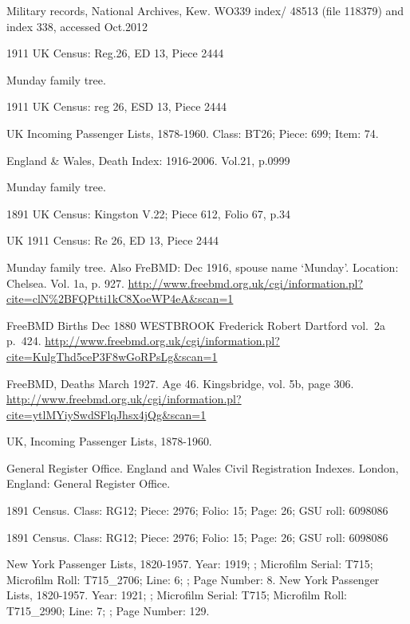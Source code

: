 \begin{thebibliography}{99}
	Military records, National Archives, Kew.
	WO339 index/ 48513 (file 118379) and index 338, accessed Oct.2012
	
	1911 UK Census: Reg.26, ED 13, Piece 2444 
	
	Munday family tree. 
	
	1911 UK Census: reg 26, ESD 13, Piece 2444 
	
	 UK Incoming Passenger Lists, 1878-1960. Class: BT26; Piece: 699; Item: 74.
	 
	England \& Wales, Death Index: 1916-2006. Vol.21, p.0999
	
	Munday family tree. 

	1891 UK Census: Kingston V.22; Piece 612, Folio 67, p.34 
	
	UK 1911 Census: Re 26, ED 13, Piece 2444
	
	Munday family tree.
	Also FreBMD: Dec 1916, spouse name `Munday'. Location: Chelsea. Vol. 1a, p. 927.
	\url{http://www.freebmd.org.uk/cgi/information.pl?cite=clN\%2BFQPtti1kC8XoeWP4eA&scan=1}

	FreeBMD Births Dec 1880
	WESTBROOK Frederick Robert Dartford vol.~2a p.~424.
	\url{http://www.freebmd.org.uk/cgi/information.pl?cite=KulgThd5ceP3F8wGoRPsLg&scan=1}

	 FreeBMD, Deaths March 1927. Age 46. Kingsbridge, vol. 5b, page 306.
	\url{http://www.freebmd.org.uk/cgi/information.pl?cite=ytlMYiySwdSFlqJhsx4jQg&scan=1}

	UK, Incoming Passenger Lists, 1878-1960. 
	
	General Register Office. England and Wales Civil Registration Indexes. London, England: General Register Office. 
	
	 1891 Census. Class: RG12; Piece: 2976; Folio: 15; Page: 26; GSU roll: 6098086
	 
	1891 Census. Class: RG12; Piece: 2976; Folio: 15; Page: 26; GSU roll: 6098086
	
	New York Passenger Lists, 1820-1957.
	Year: 1919; ; Microfilm Serial: T715; Microfilm Roll: T715\_2706; Line: 6; ; Page Number: 8.
	New York Passenger Lists, 1820-1957.
	Year: 1921; ; Microfilm Serial: T715; Microfilm Roll: T715\_2990; Line: 7; ; Page Number: 129.
	

\end{thebibliography}
